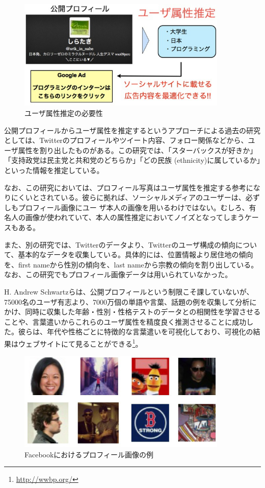 \begin{figure}[tbp]
 \begin{center}
  \includegraphics[width=100mm]{img/c7/prof2prop}
 \end{center}
 \caption{ユーザ属性推定の必要性}
 \label{c7_prof2prop}
\end{figure}

公開プロフィールからユーザ属性を推定するというアプローチによる過去の研究としては、Twitterのプロフィールやツイート内容、フォロー関係などから、ユーザ属性を割り出したものがある\cite{pennacchiotti2011a-machine}。この研究では、「スターバックスが好きか」「支持政党は民主党と共和党のどちらか」「どの民族 (ethnicity)に属しているか」といった情報を推定している。\par
なお、この研究においては、プロフィール写真はユーザ属性を推定する参考になりにくいとされている。彼らに拠れば、ソーシャルメディアのユーザーは、必ずしもプロフィール画像にユー
ザ本人の画像を用いるわけではない。むしろ、有名人の画像が使われていて、本人の属性推定においてノイズとなってしまうケースもある。\par
また、別の研究\cite{mislove2011understanding}では、Twitterのデータより、Twitterのユーザ構成の傾向について、基本的なデータを収集している。具体的には、位置情報より居住地の傾向を、first nameから性別の傾向を、last nameから宗教の傾向を割り出している。なお、この研究でもプロフィール画像データは用いられていなかった。\par
H. Andrew Schwartzらは、公開プロフィールという制限こそ課していないが、75000名のユーザ有志より、7000万個の単語や言葉、話題の例を収集して分析にかけ、同時に収集した年齢・性別・性格テストのデータとの相関性を学習させることや、言葉遣いからこれらのユーザ属性を精度良く推測させることに成功した\cite{schwartz2013personality}。彼らは、年代や性格ごとに特徴的な言葉遣いを可視化しており、可視化の結果はウェブサイトにて見ることができる\footnote{\url{http://wwbp.org/}}。

\begin{figure}[tbp]
 \begin{center}
  \includegraphics[width=100mm]{img/c7/pic_sample}
 \end{center}
 \caption{Facebookにおけるプロフィール画像の例}
 \label{c7_pic_sample}
\end{figure}

